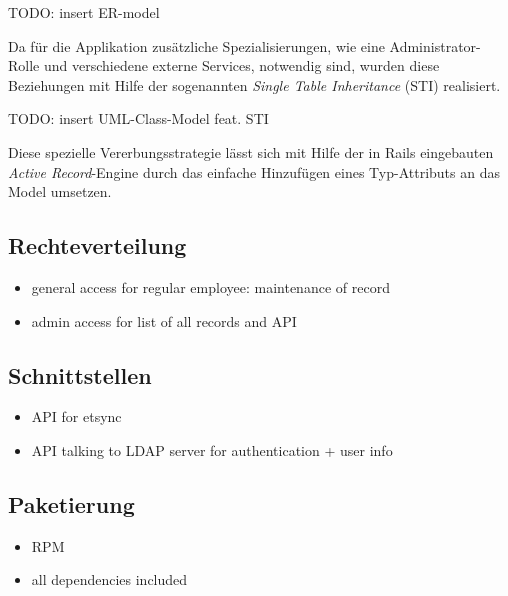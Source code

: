 TODO: insert ER-model

Da für die Applikation zusätzliche Spezialisierungen, wie eine Administrator-Rolle und verschiedene
externe Services, notwendig sind, wurden diese Beziehungen mit Hilfe der sogenannten
\textit{Single Table Inheritance} (STI) realisiert.

TODO: insert UML-Class-Model feat. STI

Diese spezielle Vererbungsstrategie lässt sich mit Hilfe der in Rails eingebauten
\textit{Active Record}-Engine durch das einfache Hinzufügen eines Typ-Attributs an das Model
umsetzen.

\subsection{Rechteverteilung}
\label{sec:Rechteverteilung}
\begin{itemize}
	\item general access for regular employee: maintenance of record
	\item admin access for list of all records and API
\end{itemize}

\subsection{Schnittstellen}
\label{sec:Schnittstellen}
\begin{itemize}
	\item API for etsync
	\item API talking to LDAP server for authentication + user info
\end{itemize}

\subsection{Paketierung}
\label{sec:Paketierung}
\begin{itemize}
	\item RPM
	\item all dependencies included
\end{itemize}
